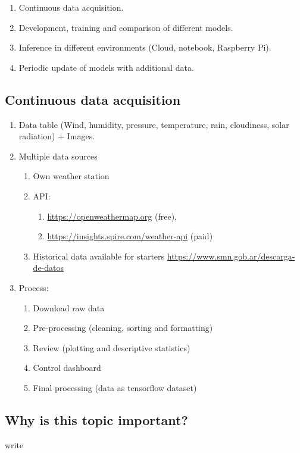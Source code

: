 \documentclass[10pt,a4paper]{article}
\begin{document}
\begin{enumerate}
	\item Continuous data acquisition.
	\item Development, training and comparison of different models.
	\item Inference in different environments (Cloud, notebook, Raspberry Pi).
	\item Periodic update of models with additional data.
\end{enumerate}

\subsection{Continuous data acquisition}

\begin{enumerate}
	\item Data table (Wind, humidity, pressure, temperature, rain, cloudiness, solar radiation) + Images.
	\item Multiple data sources
	\begin{enumerate}
		\item Own weather station
		\item API: 
		\begin{enumerate} 
			\item \url{https://openweathermap.org} (free), 
			\item \url{https://insights.spire.com/weather-api} (paid)
		\end{enumerate}
	    \item Historical data available for starters \url{https://www.smn.gob.ar/descarga-de-datos}
	\end{enumerate}
    \item Process:
    \begin{enumerate}
    	\item Download raw data
    	\item Pre-processing (cleaning, sorting and formatting)
    	\item Review (plotting and descriptive statistics)
    	\item Control dashboard
    	\item Final processing (data as tensorflow dataset)
    \end{enumerate}

\end{enumerate}
	    \subsection{Why is this topic important?}
	    write
\end{document}

